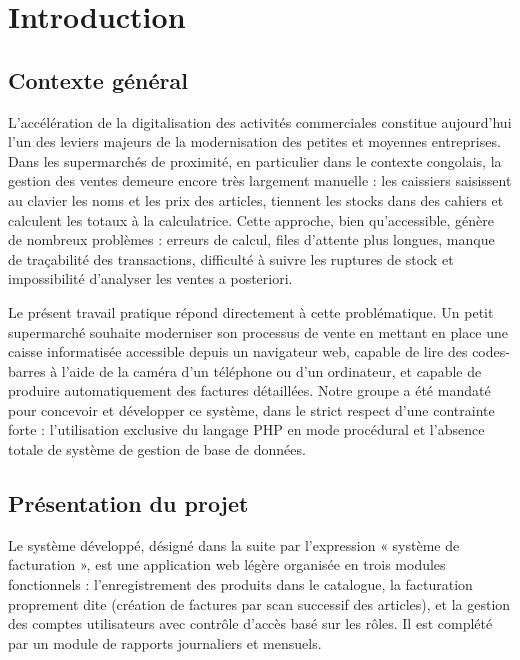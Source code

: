 \documentclass[12pt,a4paper]{article}
\begin{document}
\tableofcontents
\newpage
{}

\section{Introduction}

\subsection{Contexte général}

L'accélération de la digitalisation des activités commerciales constitue aujourd'hui l'un des leviers majeurs de la modernisation des petites et moyennes entreprises. Dans les supermarchés de proximité, en particulier dans le contexte congolais, la gestion des ventes demeure encore très largement manuelle : les caissiers saisissent au clavier les noms et les prix des articles, tiennent les stocks dans des cahiers et calculent les totaux à la calculatrice. Cette approche, bien qu'accessible, génère de nombreux problèmes : erreurs de calcul, files d'attente plus longues, manque de traçabilité des transactions, difficulté à suivre les ruptures de stock et impossibilité d'analyser les ventes a posteriori.

Le présent travail pratique répond directement à cette problématique. Un petit supermarché souhaite moderniser son processus de vente en mettant en place une caisse informatisée accessible depuis un navigateur web, capable de lire des codes-barres à l'aide de la caméra d'un téléphone ou d'un ordinateur, et capable de produire automatiquement des factures détaillées. Notre groupe a été mandaté pour concevoir et développer ce système, dans le strict respect d'une contrainte forte : l'utilisation exclusive du langage PHP en mode procédural et l'absence totale de système de gestion de base de données.

\subsection{Présentation du projet}

Le système développé, désigné dans la suite par l'expression « système de facturation », est une application web légère organisée en trois modules fonctionnels : l'enregistrement des produits dans le catalogue, la facturation proprement dite (création de factures par scan successif des articles), et la gestion des comptes utilisateurs avec contrôle d'accès basé sur les rôles. Il est complété par un module de rapports journaliers et mensuels.
\end{document}
